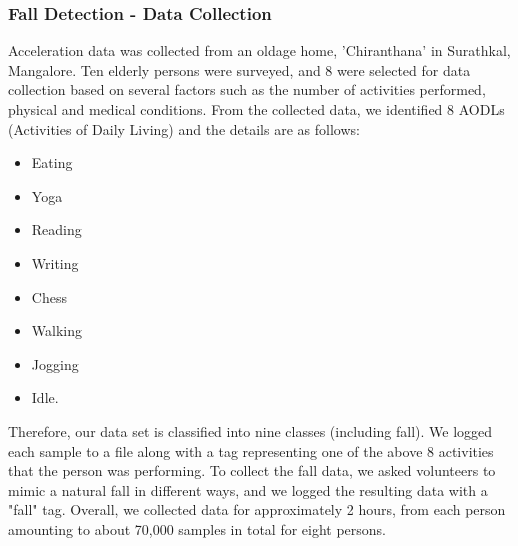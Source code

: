 \subsubsection{Fall Detection - Data Collection}
Acceleration data was collected from an oldage home, 'Chiranthana' in Surathkal, Mangalore. Ten elderly persons were surveyed, and 8 were selected for data collection based on several factors such as the number of activities performed, physical and medical conditions. From the collected data, we identified 8 AODLs (Activities of Daily Living) and the details are as follows:
\begin{itemize}
\item Eating
\item Yoga 
\item Reading
\item Writing
\item Chess
\item Walking
\item Jogging
\item Idle.
\end{itemize}

Therefore, our data set is classified into nine classes (including fall). 
We logged each sample to a file along with a tag representing one of the above 8 activities that the person was performing. To collect the fall data, we asked volunteers to mimic a natural fall in different ways, and we logged the resulting data with a "fall" tag. Overall, we collected data for approximately 2 hours, from each person amounting to about 70,000 samples in total for eight persons. 

